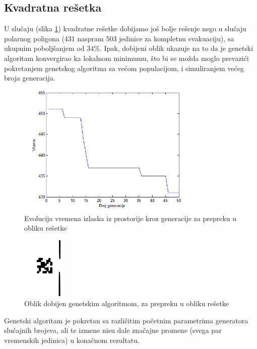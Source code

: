 \documentclass[12pt]{article}
\begin{document}
\subsection*{Kvadratna rešetka} 

U slučaju (slika \ref{fig:grid1}) kvadratne rešetke dobijamo još bolje rešenje nego u slučaju polarnog poligona (431 naspram 503 jedinice za kompletnu evakuaciju), sa ukupnim poboljšanjem od $34\%$. Ipak, dobijeni oblik ukazuje na to da je genetski algoritam konvergirao ka lokalnom minimumu, što bi se možda moglo prevazići pokretanjem genetskog algoritma sa većom populacijom, i simuliranjem većeg broja generacija. 

\begin{figure}[H]
\centering
\includegraphics[width=0.8\textwidth]{08_Grafik_evakuacija_grid}
\caption{Evolucija vremena izlaska iz prostorije kroz generacije za prepreku u obliku rešetke}
\end{figure}

\begin{figure}[H]
\centering
\includegraphics[width=0.2\textwidth]{09_Prepreka_grid}
\caption{Oblik dobijen genetskim algoritmom, za prepreku u obliku rešetke}
\label{fig:grid1}
\end{figure}

Genetski algoritam je pokretan sa različitim početnim parametrima generatora slučajnih brojeva, ali te izmene nisu dale značajne promene (svega par vremenskih jedinica) u konačnom rezultatu.
\end{document}
